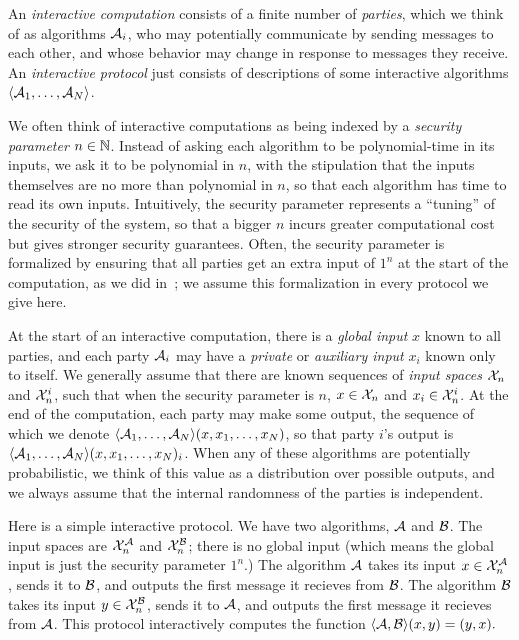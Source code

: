 An \emph{interactive computation} consists of a finite number of \emph{parties},
which we think of as algorithms $\mathcal{A}_i$, who may potentially communicate by
sending messages to each other, and whose behavior may change in response to
messages they receive. An \emph{interactive protocol}
just consists of descriptions of some interactive algorithms $\langle\mathcal{A}_1, \dots,
\mathcal{A}_N\rangle$.

We often think of interactive computations as being indexed by a \emph{security
parameter} $n\in\mathbb{N}$. Instead of asking each algorithm to be polynomial-time in
its inputs, we ask it to be polynomial in $n$, with the stipulation that the
inputs themselves are no more than polynomial in $n$, so that each algorithm has
time to read its own inputs. Intuitively, the security parameter represents a
``tuning'' of the security of the system, so that a bigger $n$ incurs greater
computational cost but gives stronger security guarantees. Often, the security
parameter is formalized by ensuring that all parties get an extra input of $1^n$ at
the start of the computation, as we did in~;
we assume this formalization in every protocol we give here.

At the start of an interactive computation, there is a \emph{global input} $x$
known to all parties, and each party $\mathcal{A}_i$ may have a \emph{private} or
\emph{auxiliary input} $x_i$ known only to itself. We generally assume that
there are known sequences of \emph{input spaces} $\mathcal{X}_n$ and $\mathcal{X}^i_n$, such that
when the security parameter is $n$, $x\in \mathcal{X}_n$ and $x_i\in \mathcal{X}^i_n$. At the end of
the computation, each party may make some output, the sequence of which we
denote $\langle\mathcal{A}_1, \dots, \mathcal{A}_N\rangle(x, x_1, \dots, x_N)$, so that party $i$'s output
is $\langle\mathcal{A}_1, \dots, \mathcal{A}_N\rangle(x, x_1, \dots, x_N)_i$. When any of these algorithms
are potentially probabilistic, we think of this value as a distribution over
possible outputs, and we always assume that the internal randomness of the
parties is independent.

\begin{ex}\label{ex:swap}
  Here is a simple interactive protocol. We have two algorithms, $\mathcal{A}$ and
  $\mathcal{B}$. The input spaces are $\mathcal{X}^{\mathcal{A}}_n$ and $\mathcal{X}^{\mathcal{B}}_n$; there is no global
  input (which means the global input is just the security parameter $1^n$.) The
  algorithm $\mathcal{A}$ takes its input $x\in\mathcal{X}^{\mathcal{A}}_n$, sends it to $\mathcal{B}$, and outputs
  the first message it recieves from $\mathcal{B}$. The algorithm $\mathcal{B}$ takes its input
  $y\in\mathcal{X}_n^{\mathcal{B}}$, sends it to $\mathcal{A}$, and outputs the first message it recieves
  from $\mathcal{A}$. This protocol interactively computes the function $
    \langle\mathcal{A},\mathcal{B}\rangle(x,y) = (y,x).
  $
\end{ex}

